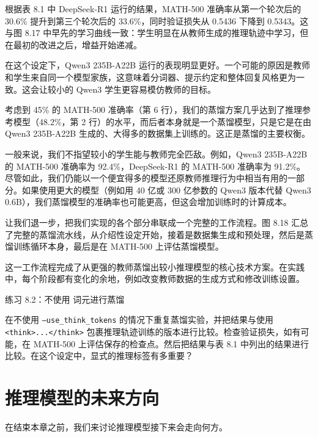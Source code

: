 根据表 8.1 中 DeepSeek-R1 运行的结果，MATH-500 准确率从第一个轮次后的 30.6\% 提升到第三个轮次后的 33.6\%，同时验证损失从 0.5436 下降到 0.5343。这与图 8.17 中早先的学习曲线一致：学生明显在从教师生成的推理轨迹中学习，但在最初的改进之后，增益开始递减。

在这个设定下，Qwen3 235B-A22B 运行的表现明显更好。一个可能的原因是教师和学生来自同一个模型家族，这意味着分词器、提示约定和整体回复风格更为一致。这会让较小的 Qwen3 学生更容易模仿教师的目标。

考虑到 45\% 的 MATH-500 准确率（第 6 行），我们的蒸馏方案几乎达到了推理参考模型（48.2\%，第 2 行）的水平，而后者本身就是一个蒸馏模型，只是它是在由 Qwen3 235B-A22B 生成的、大得多的数据集上训练的。这正是蒸馏的主要权衡。

一般来说，我们不指望较小的学生能与教师完全匹敌。例如，Qwen3 235B-A22B 的 MATH-500 准确率为 92.4\%，DeepSeek-R1 的 MATH-500 准确率为 91.2\%。尽管如此，我们仍能以一个便宜得多的模型还原教师推理行为中相当有用的一部分。如果使用更大的模型（例如用 40 亿或 300 亿参数的 Qwen3 版本代替 Qwen3 0.6B），我们蒸馏模型的准确率也可能更高，但这会增加训练时的计算成本。

让我们退一步，把我们实现的各个部分串联成一个完整的工作流程。图 8.18 汇总了完整的蒸馏流水线，从介绍性设定开始，接着是数据集生成和预处理，然后是蒸馏训练循环本身，最后是在 MATH-500 上评估蒸馏模型。


这一工作流程完成了从更强的教师蒸馏出较小推理模型的核心技术方案。在实践中，每个阶段都有变化的余地，例如改变教师数据的生成方式和修改训练设置。

\begin{mySidebar}{练习 8.2：不使用  词元进行蒸馏}

在不使用 \texttt{--use\_think\_tokens} 的情况下重复蒸馏实验，并把结果与使用 \texttt{\textless{}think\textgreater{}...\textless{}/think\textgreater{}} 包裹推理轨迹训练的版本进行比较。检查验证损失，如有可能，在 MATH-500 上评估保存的检查点。然后把结果与表 8.1 中列出的结果进行比较。在这个设定中，显式的推理标签有多重要？

\end{mySidebar}

\section{推理模型的未来方向}

在结束本章之前，我们来讨论推理模型接下来会走向何方。

